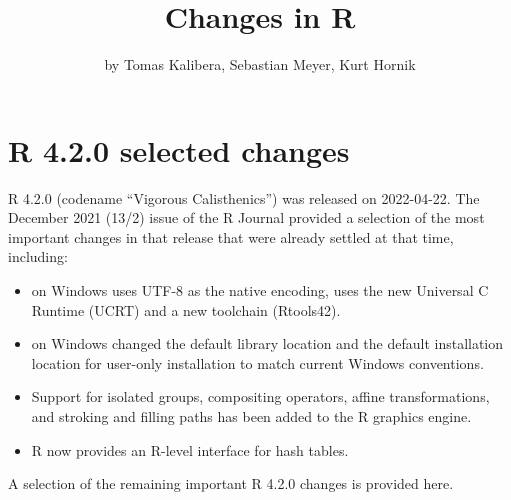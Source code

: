 \title{Changes in R}
\author{by Tomas Kalibera, Sebastian Meyer, Kurt Hornik}

\maketitle



\section{R 4.2.0 selected changes}

R 4.2.0 (codename ``Vigorous Calisthenics'') was released on 2022-04-22. 
The December 2021 (13/2) issue of the R Journal provided a selection of the most
important changes in that release that were already settled at that time,
including:

\begin{itemize}

\item{} \R{} on Windows uses UTF-8 as the native encoding, uses the new
Universal C Runtime (UCRT) and a new toolchain (Rtools42). 

\item{} \R{} on Windows changed the default library location and the default
installation location for user-only installation to match current Windows
conventions.

\item{} Support for isolated groups, compositing operators, affine
transformations, and stroking and filling paths has been added to the R
graphics engine. 

\item{} R now provides an R-level interface for hash tables.

\end{itemize}

A selection of the remaining important R 4.2.0 changes is provided here.

